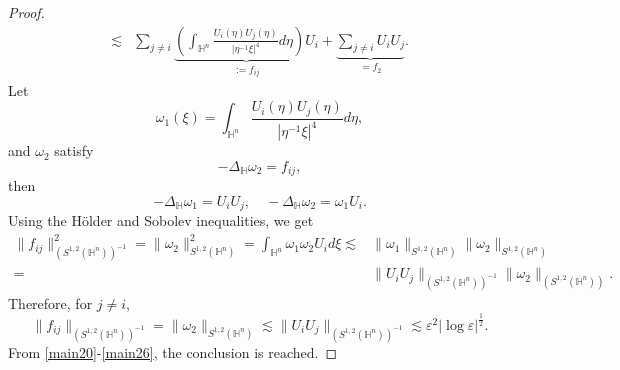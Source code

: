 \documentclass[10pt,a4paper]{amsart}
\begin{document}
\begin{proof}
\begin{align}
   \lesssim&\sum\limits_{j\neq i}\underbrace{\left(\int_{\mathbb{H}^{n}}\frac{U_i(\eta) U_j(\eta)}{|\eta^{-1}\xi|^{4}}{d}\eta\right)U_i}_{:=f_{ij}}+\underbrace{\sum\limits_{j\neq i}U_iU_j}_{=f_2}.
\end{align}
Let
\begin{equation*}
  \omega_1(\xi)=\int_{\mathbb{H}^{n}}\frac{U_i(\eta) U_j(\eta)}{|\eta^{-1}\xi|^{4}}{d}\eta,
\end{equation*}
and $\omega_2$ satisfy
\begin{equation*}
 -\Delta_{\mathbb{H}} \omega_2=f_{ij},
\end{equation*}
then
\begin{equation*}
  -\Delta_{\mathbb{H}}\omega_1=U_i U_j,\quad -\Delta_{\mathbb{H}}\omega_2=\omega_1U_i.
\end{equation*}
Using the H\"{o}lder and Sobolev inequalities, we get
\begin{align*}
  \|f_{ij}\|^2_{(S^{1,2}(\mathbb{H}^{n}))^{-1}}=\|\omega_2\|^2_{S^{1,2}(\mathbb{H}^{n})}=
  \int_{\mathbb{H}^{n}}\omega_1\omega_2U_id\xi\lesssim & \|\omega_1\|_{S^{1,2}(\mathbb{H}^{n})}\|\omega_2\|_{S^{1,2}(\mathbb{H}^{n})}\\
  =& \|U_i U_j\|_{(S^{1,2}(\mathbb{H}^{n}))^{-1}}\|\omega_2\|_{(S^{1,2}(\mathbb{H}^{n}))}.
\end{align*}
Therefore, for $j\neq i$,
\begin{equation}\label{main26}
  \|f_{ij}\|_{(S^{1,2}(\mathbb{H}^{n}))^{-1}}=\|\omega_2\|_{S^{1,2}(\mathbb{H}^{n})}\lesssim \|U_i U_j\|_{(S^{1,2}(\mathbb{H}^{n}))^{-1}}\lesssim \varepsilon^2|\log \varepsilon|^{\frac{1}{2}}.
\end{equation}
From \eqref{main20}-\eqref{main26}, the conclusion is reached.
\end{proof}
\end{document}

